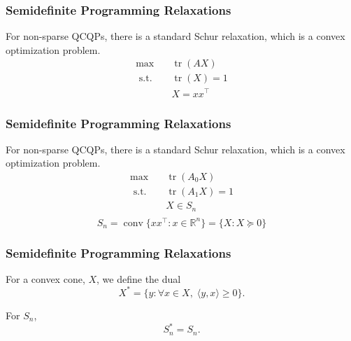 \documentclass{beamer}
\newcommand{\R}{\mathbb{R}}
\DeclareMathOperator{\conv}{\operatorname{conv}}
\DeclareMathOperator{\tr}{tr}
\newcommand{\st}{{\text{ s.t. }}}
\begin{document}
\begin{frame}
\frametitle{Semidefinite Programming Relaxations}
    For non-sparse QCQPs, there is a standard Schur relaxation, which is a convex
    optimization problem.
    \begin{equation*}
        \begin{aligned}
            \max\quad & \tr(AX)\\
            \st & \tr(X) = 1\\
            & X = xx^{\intercal}
        \end{aligned}
    \end{equation*}
    \vspace{0.3in}
\end{frame}
\begin{frame}
\frametitle{Semidefinite Programming Relaxations}
    For non-sparse QCQPs, there is a standard Schur relaxation, which is a convex
    optimization problem.
    \begin{equation*}
        \begin{aligned}
            \max\quad & \tr(A_0X)\\
            \st & \tr(A_1X) = 1\\
                & X \in S_n\\
        \end{aligned}
    \end{equation*}
    \pause 
    \[
        S_n = \conv \{ xx^{\intercal} : x \in \R^n\} = \{X : X \succeq 0\}
    \]
\end{frame}
\begin{frame}
\frametitle{Semidefinite Programming Relaxations}
    For a convex cone, $X$, we define the dual 
    \[
        X^* = \{y : \forall x \in X,\;\langle y, x \rangle \ge 0 \}.
    \]


    For $S_n$,
    \[
        S_n^* = S_n.
    \]
\end{frame}
\end{document}
